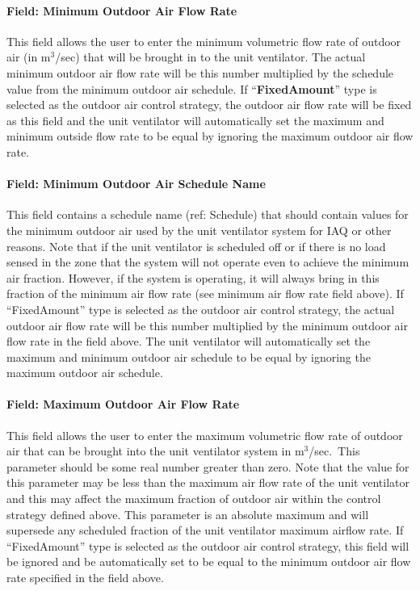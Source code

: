 \paragraph{Field: Minimum Outdoor Air Flow Rate}\label{field-minimum-outdoor-air-flow-rate-002}

This field allows the user to enter the minimum volumetric flow rate of outdoor air (in m\(^{3}\)/sec) that will be brought in to the unit ventilator. The actual minimum outdoor air flow rate will be this number multiplied by the schedule value from the minimum outdoor air schedule. If ``\textbf{FixedAmount}'' type is selected as the outdoor air control strategy, the outdoor air flow rate will be fixed as this field and the unit ventilator will automatically set the maximum and minimum outside flow rate to be equal by ignoring the maximum outdoor air flow rate.

\paragraph{Field: Minimum Outdoor Air Schedule Name}\label{field-minimum-outdoor-air-schedule-name-002}

This field contains a schedule name (ref: Schedule) that should contain values for the minimum outdoor air used by the unit ventilator system for IAQ or other reasons. Note that if the unit ventilator is scheduled off or if there is no load sensed in the zone that the system will not operate even to achieve the minimum air fraction. However, if the system is operating, it will always bring in this fraction of the minimum air flow rate (see minimum air flow rate field above). If ``FixedAmount'' type is selected as the outdoor air control strategy, the actual outdoor air flow rate will be this number multiplied by the minimum outdoor air flow rate in the field above. The unit ventilator will automatically set the maximum and minimum outdoor air schedule to be equal by ignoring the maximum outdoor air schedule.

\paragraph{Field: Maximum Outdoor Air Flow Rate}\label{field-maximum-outdoor-air-flow-rate-1-000}

This field allows the user to enter the maximum volumetric flow rate of outdoor air that can be brought into the unit ventilator system in m\(^{3}\)/sec.~This parameter should be some real number greater than zero. Note that the value for this parameter may be less than the maximum air flow rate of the unit ventilator and this may affect the maximum fraction of outdoor air within the control strategy defined above. This parameter is an absolute maximum and will supersede any scheduled fraction of the unit ventilator maximum airflow rate. If ``FixedAmount'' type is selected as the outdoor air control strategy, this field will be ignored and be automatically set to be equal to the minimum outdoor air flow rate specified in the field above.

